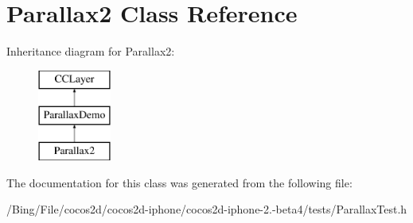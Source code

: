 \hypertarget{interface_parallax2}{\section{Parallax2 Class Reference}
\label{interface_parallax2}
}
Inheritance diagram for Parallax2\-:\begin{figure}[H]
\begin{center}
\leavevmode
\includegraphics[height=3.000000cm]{interface_parallax2}
\end{center}
\end{figure}


The documentation for this class was generated from the following file\-:\begin{DoxyCompactItemize}
\item 
/\-Bing/\-File/cocos2d/cocos2d-\/iphone/cocos2d-\/iphone-\/2.-\/beta4/tests/Parallax\-Test.\-h\end{DoxyCompactItemize}

